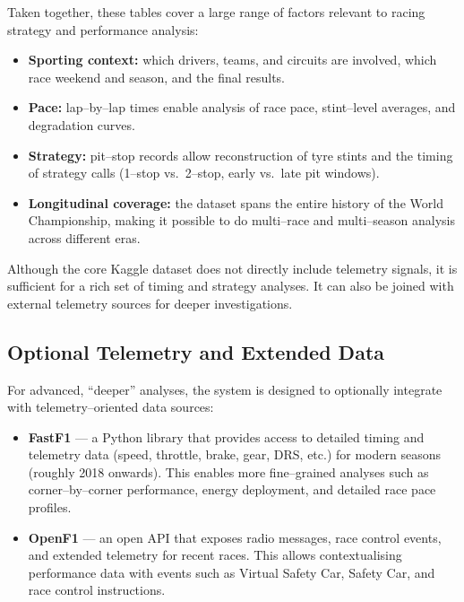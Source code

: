 \documentclass[11pt]{article}
\begin{document}
Taken together, these tables cover a large range of factors relevant to racing strategy and performance analysis:

\begin{itemize}[leftmargin=1.5em]
    \item \textbf{Sporting context:} which drivers, teams, and circuits are involved, which race weekend and season, and the final results.
    \item \textbf{Pace:} lap–by–lap times enable analysis of race pace, stint–level averages, and degradation curves.
    \item \textbf{Strategy:} pit–stop records allow reconstruction of tyre stints and the timing of strategy calls (1–stop vs.\ 2–stop, early vs.\ late pit windows).
    \item \textbf{Longitudinal coverage:} the dataset spans the entire history of the World Championship, making it possible to do multi–race and multi–season analysis across different eras.
\end{itemize}

Although the core Kaggle dataset does not directly include telemetry signals, it is sufficient for a rich set of timing and strategy analyses. It can also be joined with external telemetry sources for deeper investigations.

\subsection{Optional Telemetry and Extended Data}

For advanced, ``deeper'' analyses, the system is designed to optionally integrate with telemetry–oriented data sources:

\begin{itemize}[leftmargin=1.5em]
    \item \textbf{FastF1} --- a Python library that provides access to detailed timing and telemetry data (speed, throttle, brake, gear, DRS, etc.) for modern seasons (roughly 2018 onwards). This enables more fine–grained analyses such as corner–by–corner performance, energy deployment, and detailed race pace profiles.
    \item \textbf{OpenF1} --- an open API that exposes radio messages, race control events, and extended telemetry for recent races. This allows contextualising performance data with events such as Virtual Safety Car, Safety Car, and race control instructions.
\end{itemize}
\end{document}
